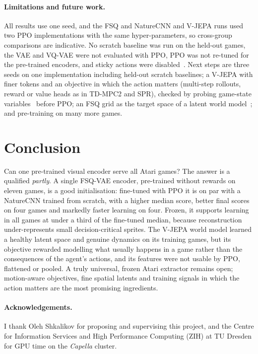 \documentclass[runningheads]{llncs}
\begin{document}
\paragraph{Limitations and future work.} All results use one seed, and the FSQ and
NatureCNN and V-JEPA runs used two PPO implementations with the same hyper-parameters, so
cross-group comparisons are indicative. No scratch baseline was run on the held-out games, the
VAE and VQ-VAE were not evaluated with PPO, PPO was not re-tuned for the pre-trained encoders,
and sticky actions were disabled~\cite{machado2018revisiting}. Next steps are three seeds on one
implementation including held-out scratch baselines; a V-JEPA with finer tokens and an
objective in which the action matters (multi-step rollouts, reward or value heads as in
TD-MPC2 and SPR), checked by probing game-state variables~\cite{anand2019atariari} before PPO;
an FSQ grid as the target space of a latent world model~\cite{hafner2021dreamerv2,micheli2023iris};
and pre-training on many more games.

\section{Conclusion}
\label{sec:conclusion}

Can one pre-trained visual encoder serve all Atari games? The answer is a qualified
\emph{partly}. A single FSQ-VAE encoder, pre-trained without rewards on eleven games, is a
good initialisation: fine-tuned with PPO it is on par with a NatureCNN trained from scratch,
with a higher median score, better final scores on four games and markedly faster learning
on four. Frozen, it supports learning in all games at under a third of the fine-tuned median,
because reconstruction under-represents small decision-critical sprites. The V-JEPA world
model learned a healthy latent space and genuine dynamics on its training games, but its
objective rewarded modelling what usually happens in a game rather than the consequences of
the agent's actions, and its features were not usable by PPO, flattened or pooled. A truly
universal, frozen Atari extractor remains open; motion-aware objectives, fine spatial latents
and training signals in which the action matters are the most promising ingredients.

\paragraph{Acknowledgements.}
I thank Oleh Shkalikov for proposing and supervising this project, and the Centre for
Information Services and High Performance Computing (ZIH) at TU Dresden for GPU time on the
\emph{Capella} cluster.



\end{document}
